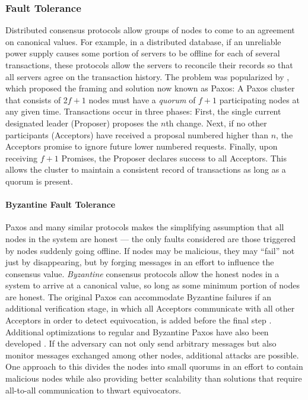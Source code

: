   \subsubsection{Fault Tolerance}
    Distributed consensus protocols allow groups of nodes to come to an
    agreement on canonical values. For example, in a distributed database, if an
    unreliable power supply causes some portion of servers to be offline for
    each of several transactions, these protocols allow the
    servers to reconcile their records so that all servers agree on the
    transaction history. The problem was popularized by
    \cite{lamport_part-time_1998}, which proposed the framing and solution now
    known as Paxos: A Paxos cluster that consists of 2$f+1$ nodes must have a
    \emph{quorum} of $f + 1$ participating nodes at any given time.
    Transactions occur in three phases: First, the single current designated
    leader (Proposer) proposes the $n$th change. Next, if no other participants
    (Acceptors) have received a proposal numbered higher than $n$, the Acceptors
    promise to ignore future lower numbered requests.  Finally, upon receiving
    $f+1$ Promises, the Proposer declares success to all Acceptors. This allows
    the cluster to maintain a consistent record of transactions as long as a
    quorum is present.

  \paragraph{Byzantine Fault Tolerance}
    Paxos and many similar protocols makes the simplifying assumption that all
    nodes in the system are honest --- the only faults considered are those
    triggered by nodes suddenly going offline. If nodes may be malicious, they
    may ``fail'' not just by disappearing, but by forging messages in an effort
    to influence the consensus value. \emph{Byzantine} consensus protocols allow
    the honest nodes in a system to arrive at a canonical value, so long as some
    minimum portion of nodes are honest. The original Paxos can
    accommodate Byzantine failures if an additional verification stage, in which
    all Acceptors communicate with all other Acceptors in order to detect
    equivocation, is added before the final step \cite{castro_practical_1999}.
    Additional optimizations to regular and Byzantine Paxos have also been
    developed \cite{lamport_fast_2006}. If the adversary can not only send
    arbitrary messages but also monitor messages exchanged among other nodes,
    additional attacks are possible. One approach to this divides the nodes into
    small quorums in an effort to contain malicious nodes \cite{king_load_2011}
    while also providing better scalability than solutions that require
    all-to-all communication to thwart equivocators.

